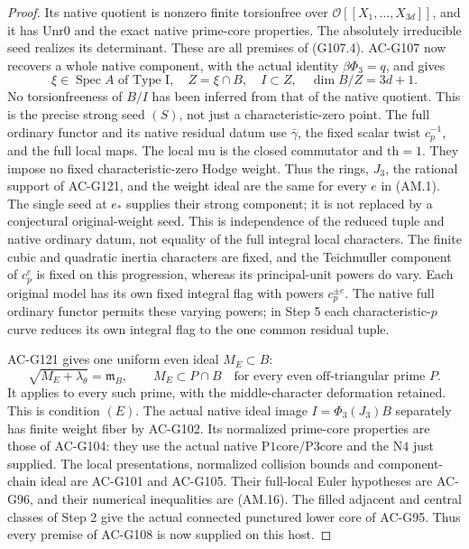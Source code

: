 \begin{proof}
Its native quotient is nonzero finite torsionfree over
\(\mathcal O[[X_1,\ldots,X_{3d}]]\), and it has
\(\mathrm{Unr0}\) and the exact native prime-core properties.
The absolutely irreducible seed realizes its determinant.
These are all premises of (G107.4).
AC-G107 now recovers a whole native component, with the
actual identity \(\beta\Phi_3=q\), and gives
\[
 \xi\in\operatorname{Spec}A\text{ of Type I},\quad
 Z=\xi\cap B,\quad I\subset Z,\quad \dim B/Z=3d+1.
 \tag{AM.18}
\]
No torsionfreeness of \(B/I\) has been inferred from that
of the native quotient.  This is the precise strong
seed \((S)\), not just a characteristic-zero point.
The full ordinary functor and its native residual datum use
\(\bar\gamma\), the fixed scalar twist \(c_p^{-1}\), and
the full local maps.  The local \(\mathrm{mu}\) is the
closed commutator and \(\mathrm{th}=1\).  They impose no
fixed characteristic-zero Hodge weight.
Thus the rings, \(J_3\), the rational support of AC-G121,
and the weight ideal are the same for every \(e\) in (AM.1).
The single seed at \(e_*\) supplies their strong component;
it is not replaced by a conjectural original-weight seed.
This is independence of the reduced tuple and native
ordinary datum, not equality of the full integral local
characters.  The finite cubic and quadratic inertia
characters are fixed, and the Teichmuller component of
\(c_p^e\) is fixed on this progression, whereas its
principal-unit powers do vary.  Each original model has
its own fixed integral flag with powers \(c_p^{\pm e}\).
The native full ordinary functor permits these varying
powers; in Step 5 each characteristic-\(p\) curve reduces
its own integral flag to the one common residual tuple.

AC-G121 gives one uniform even ideal \(M_E\subset B\):
\[
 \sqrt{M_E+\lambda_\theta}=\mathfrak m_B,\qquad
 M_E\subset P\cap B
       \quad\text{for every even off-triangular prime }P.
 \tag{AM.19}
\]
It applies to every such prime, with the middle-character
deformation retained.  This is condition \((E)\).
The actual native ideal image \(I=\Phi_3(J_3)B\) separately
has finite weight fiber by AC-G102.
Its normalized prime-core properties are those of AC-G104:
they use the actual native \(\mathrm{P1core}/\mathrm{P3core}\)
and the \(\mathrm{N4}\) just supplied.
The local presentations, normalized collision bounds and
component-chain ideal are AC-G101 and AC-G105.
Their full-local Euler hypotheses are AC-G96, and their
numerical inequalities are (AM.16).
The filled adjacent and central classes of Step 2 give
the actual connected punctured lower core of AC-G95.
Thus every premise of AC-G108 is now supplied on this host.


\end{proof}
